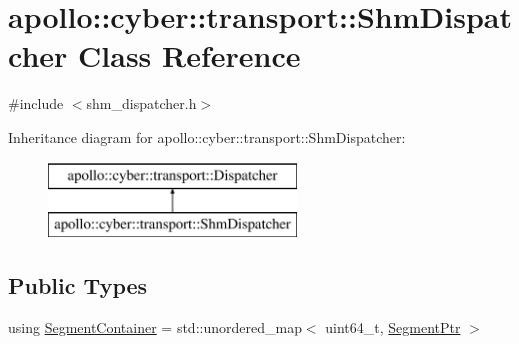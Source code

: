 \hypertarget{classapollo_1_1cyber_1_1transport_1_1ShmDispatcher}{\section{apollo\-:\-:cyber\-:\-:transport\-:\-:Shm\-Dispatcher Class Reference}
\label{classapollo_1_1cyber_1_1transport_1_1ShmDispatcher}
}


{\ttfamily \#include $<$shm\-\_\-dispatcher.\-h$>$}

Inheritance diagram for apollo\-:\-:cyber\-:\-:transport\-:\-:Shm\-Dispatcher\-:\begin{figure}[H]
\begin{center}
\leavevmode
\includegraphics[height=2.000000cm]{classapollo_1_1cyber_1_1transport_1_1ShmDispatcher}
\end{center}
\end{figure}
\subsection*{Public Types}
\begin{DoxyCompactItemize}
\item 
using \hyperlink{classapollo_1_1cyber_1_1transport_1_1ShmDispatcher_af4b802d682732bf22e6f0d04fe0bb620}{Segment\-Container} = std\-::unordered\-\_\-map$<$ uint64\-\_\-t, \hyperlink{namespaceapollo_1_1cyber_1_1transport_ae92e21f5ec6b011ba398cd6907465406}{Segment\-Ptr} $>$
\end{DoxyCompactItemize}
